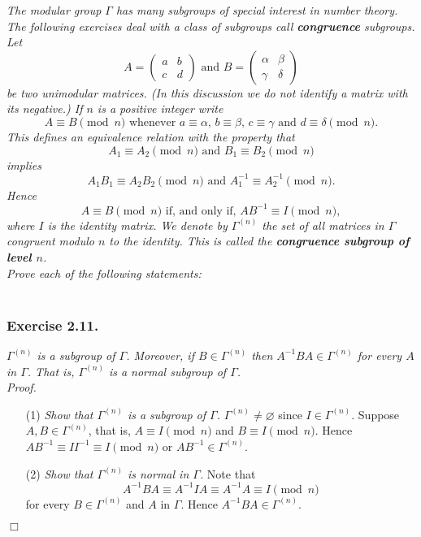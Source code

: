 \documentclass{article}
\begin{document}
\emph{The modular group $\Gamma$ has many subgroups of special interest in number theory.
The following exercises deal with a class of subgroups call \textbf{congruence} subgroups.
Let
\[
  A =
  \begin{pmatrix}
    a & b \\
    c & d
  \end{pmatrix}
  \text{ and }
  B =
  \begin{pmatrix}
    \alpha & \beta \\
    \gamma & \delta
  \end{pmatrix}
\]
be two unimodular matrices.
(In this discussion we do not identify a matrix with its negative.)
If $n$ is a positive integer write
\[
  A \equiv B \pmod{n}
  \text{ whenever $a \equiv \alpha$, $b \equiv \beta$, $c \equiv \gamma$ and $d \equiv \delta \pmod{n}$.}
\]
This defines an equivalence relation with the property that
\[
  A_1 \equiv A_2 \pmod{n}
  \text{ and }
  B_1 \equiv B_2 \pmod{n}
\]
implies
\[
  A_1B_1 \equiv A_2B_2 \pmod{n}
  \text{ and }
  A_1^{-1} \equiv A_2^{-1} \pmod{n}.
\]
Hence
\[
  A \equiv B \pmod{n}
  \text{ if, and only if, }
  AB^{-1} \equiv I \pmod{n},
\]
where $I$ is the identity matrix.
We denote by $\Gamma^{(n)}$ the set of all matrices in $\Gamma$ congruent modulo $n$ to the identity.
This is called the \textbf{congruence subgroup of level $n$}.} \\

\emph{Prove each of the following statements:} \\\\



\subsubsection*{Exercise 2.11.}
\emph{$\Gamma^{(n)}$ is a subgroup of $\Gamma$.
Moreover, if $B \in \Gamma^{(n)}$ then $A^{-1}BA \in \Gamma^{(n)}$ for every $A$ in $\Gamma$.
That is, $\Gamma^{(n)}$ is a normal subgroup of $\Gamma$.} \\



\emph{Proof.}
\begin{enumerate}
\item[(1)]
  \emph{Show that $\Gamma^{(n)}$ is a subgroup of $\Gamma$.}
  $\Gamma^{(n)} \neq \varnothing$ since $I \in \Gamma^{(n)}$.
  Suppose $A, B \in \Gamma^{(n)}$, that is, $A \equiv I \pmod{n}$ and $B \equiv I \pmod{n}$.
  Hence $AB^{-1} \equiv I I^{-1} \equiv I \pmod{n}$ or $AB^{-1} \in \Gamma^{(n)}$.

\item[(2)]
  \emph{Show that $\Gamma^{(n)}$ is normal in $\Gamma$.}
  Note that
  \[
    A^{-1}BA \equiv A^{-1}IA \equiv A^{-1}A \equiv I \pmod{n}
  \]
  for every $B \in \Gamma^{(n)}$ and $A$ in $\Gamma$.
  Hence $A^{-1}BA \in \Gamma^{(n)}$.
\end{enumerate}
$\Box$ \\\\
\end{document}
